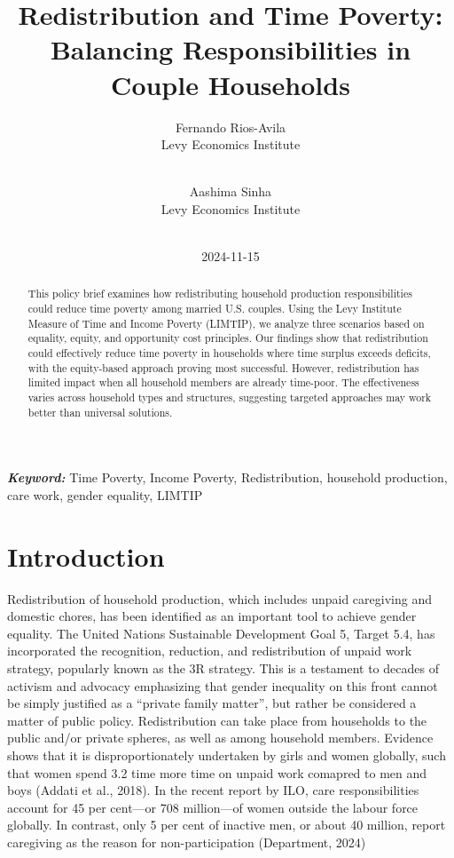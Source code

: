 \documentclass[
  11pt,
]{article}
\title{Redistribution and Time Poverty: Balancing Responsibilities in
Couple Households}
\author{
Fernando Rios-Avila\\
Levy Economics Institute\\
\\
\and 
Aashima Sinha\\
Levy Economics Institute\\
\\
}
\date{2024-11-15}
\begin{document}
\def\spacingset#1{\renewcommand{\baselinestretch}%
{#1}\small\normalsize} \spacingset{1}


\maketitle
\begin{abstract}
This policy brief examines how redistributing household production
responsibilities could reduce time poverty among married U.S. couples.
Using the Levy Institute Measure of Time and Income Poverty (LIMTIP), we
analyze three scenarios based on equality, equity, and opportunity cost
principles. Our findings show that redistribution could effectively
reduce time poverty in households where time surplus exceeds deficits,
with the equity-based approach proving most successful. However,
redistribution has limited impact when all household members are already
time-poor. The effectiveness varies across household types and
structures, suggesting targeted approaches may work better than
universal solutions.
\end{abstract}
 
\vspace{.2in}

\textbf{\textit{Keyword: }}Time Poverty, Income Poverty, Redistribution,
household production, care work, gender equality, LIMTIP


\thispagestyle{empty}
\clearpage{}
\newpage
\spacingset{1.2} %
\section{Introduction}\label{introduction}

Redistribution of household production, which includes unpaid caregiving
and domestic chores, has been identified as an important tool to achieve
gender equality. The United Nations Sustainable Development Goal 5,
Target 5.4, has incorporated the recognition, reduction, and
redistribution of unpaid work strategy, popularly known as the 3R
strategy. This is a testament to decades of activism and advocacy
emphasizing that gender inequality on this front cannot be simply
justified as a ``private family matter'', but rather be considered a
matter of public policy. Redistribution can take place from households
to the public and/or private spheres, as well as among household
members. Evidence shows that it is disproportionately undertaken by
girls and women globally, such that women spend 3.2 time more time on
unpaid work comapred to men and boys (Addati et al., 2018). In the
recent report by ILO, care responsibilities account for 45 per cent---or
708 million---of women outside the labour force globally. In contrast,
only 5 per cent of inactive men, or about 40 million, report caregiving
as the reason for non-participation (Department, 2024)
\end{document}
